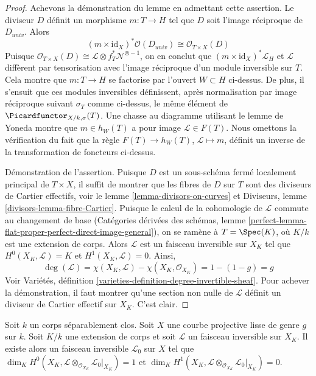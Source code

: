 \begin{proof}
\medskip\noindent
Achevons la démonstration du lemme en admettant cette assertion.
Le diviseur $D$ définit un morphisme $m : T \to H$ tel que $D$ soit l'image réciproque de
$D_{univ}$. Alors
$$
(m \times \text{id}_X)^*\mathcal{O}(D_{univ}) \cong
\mathcal{O}_{T \times X}(D)
$$
Puisque $\mathcal{O}_{T \times X}(D) \cong
\mathcal{L} \otimes f_T^*\mathcal{N}^{\otimes -1}$,
on en conclut que $(m \times \text{id}_X)^*\mathcal{L}_H$ et $\mathcal{L}$
diffèrent par tensorisation avec l'image réciproque d'un module inversible sur $T$.
Cela montre que $m : T \to H$ se factorise par l'ouvert $W \subset H$ ci-dessus.
De plus, il s'ensuit que ces modules inversibles définissent, après normalisation
par image réciproque suivant $\sigma_T$ comme ci-dessus, le même élément de
$\Picardfunctor_{X/k, \sigma}(T)$. Une chasse au diagramme utilisant le lemme de Yoneda
montre que $m \in h_W(T)$ a pour image $\mathcal{L} \in F(T)$. Nous omettons
la vérification du fait que la règle $F(T) \to h_W(T)$,
$\mathcal{L} \mapsto m$, définit un inverse de la transformation
de foncteurs ci-dessus.

\medskip\noindent
Démonstration de l'assertion. Puisque $D$ est un sous-schéma fermé localement principal
de $T \times X$, il suffit de montrer que les fibres de $D$ sur $T$ sont des
diviseurs de Cartier effectifs, voir le lemme \ref{lemma-divisors-on-curves} et
Diviseurs, lemme \ref{divisors-lemma-fibre-Cartier}. Puisque le calcul
de la cohomologie de $\mathcal{L}$ commute au changement de base
(Catégories dérivées des schémas, lemme
\ref{perfect-lemma-flat-proper-perfect-direct-image-general}),
on se ramène à $T = \Spec(K)$, où $K/k$ est une extension de corps.
Alors $\mathcal{L}$ est un faisceau inversible sur $X_K$ tel que
$H^0(X_K, \mathcal{L}) = K$ et $H^1(X_K, \mathcal{L}) = 0$. Ainsi,
$$
\deg(\mathcal{L}) = \chi(X_K, \mathcal{L}) - \chi(X_K, \mathcal{O}_{X_K})
= 1 - (1 - g) = g
$$
Voir Variétés, définition \ref{varieties-definition-degree-invertible-sheaf}.
Pour achever la démonstration, il faut montrer qu'une section non nulle de $\mathcal{L}$
définit un diviseur de Cartier effectif sur $X_K$.
C'est clair.
\end{proof}

\begin{lemma}
\label{lemma-twist-with-general-divisor}
Soit $k$ un corps séparablement clos. Soit $X$ une courbe projective lisse
de genre $g$ sur $k$. Soit $K/k$ une extension de corps et soit
$\mathcal{L}$ un faisceau inversible sur $X_K$. Il existe alors un
faisceau inversible $\mathcal{L}_0$ sur $X$ tel que
$\dim_K H^0(X_K,
\mathcal{L} \otimes_{\mathcal{O}_{X_K}} \mathcal{L}_0|_{X_K}) = 1$ et
$\dim_K H^1(X_K,
\mathcal{L} \otimes_{\mathcal{O}_{X_K}} \mathcal{L}_0|_{X_K}) = 0$.
\end{lemma}

